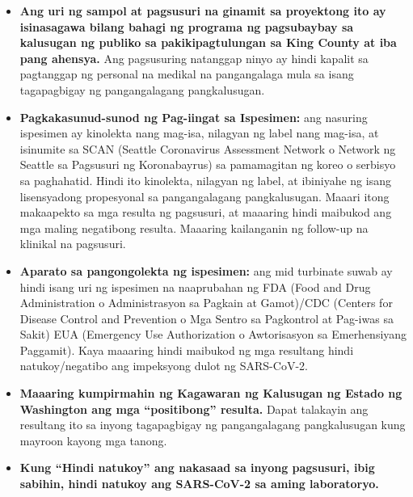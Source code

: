 \documentclass[10pt]{article}
\begin{document}
\begin{itemize}
\item

  \textbf{Ang uri ng sampol at pagsusuri na ginamit sa proyektong ito ay
  isinasagawa bilang bahagi ng programa ng pagsubaybay sa kalusugan ng publiko
  sa pakikipagtulungan sa King County at iba pang ahensya.} Ang pagsusuring
  natanggap ninyo ay hindi kapalit sa pagtanggap ng personal na medikal na
  pangangalaga mula sa isang tagapagbigay ng pangangalagang pangkalusugan.

\item

  \textbf{Pagkakasunud-sunod ng Pag-iingat sa Ispesimen:} ang nasuring ispesimen
  ay kinolekta nang mag-isa, nilagyan ng label nang mag-isa, at isinumite sa
  SCAN (Seattle Coronavirus Assessment Network o Network ng Seattle sa Pagsusuri
  ng Koronabayrus) sa pamamagitan ng koreo o serbisyo sa paghahatid. Hindi ito
  kinolekta, nilagyan ng label, at ibiniyahe ng isang lisensyadong propesyonal
  sa pangangalagang pangkalusugan. Maaari itong makaapekto sa mga resulta ng
  pagsusuri, at maaaring hindi maibukod ang mga maling negatibong resulta.
  Maaaring kailanganin ng follow-up na klinikal na pagsusuri.

\item

  \textbf{Aparato sa pangongolekta ng ispesimen:} ang mid turbinate suwab ay
  hindi isang uri ng ispesimen na naaprubahan ng FDA (Food and Drug
  Administration o Administrasyon sa Pagkain at Gamot)/CDC (Centers for Disease
  Control and Prevention o Mga Sentro sa Pagkontrol at Pag-iwas sa Sakit) EUA
  (Emergency Use Authorization o Awtorisasyon sa Emerhensiyang Paggamit). Kaya
  maaaring hindi maibukod ng mga resultang hindi natukoy/negatibo ang impeksyong
  dulot ng SARS-CoV-2.

\item

  \textbf{Maaaring kumpirmahin ng Kagawaran ng Kalusugan ng Estado ng Washington
  ang mga ``positibong'' resulta.} Dapat talakayin ang resultang ito sa inyong
  tagapagbigay ng pangangalagang pangkalusugan kung mayroon kayong mga tanong.

\item{
  \textbf{Kung ``Hindi natukoy'' ang nakasaad sa inyong pagsusuri, ibig sabihin,
  hindi natukoy ang SARS-CoV-2 sa aming laboratoryo.}

}
\end{itemize}
\end{document}
